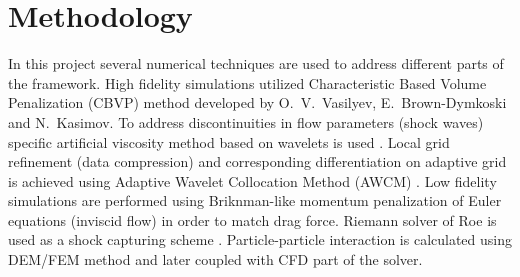 \section{Methodology}
In this project several numerical techniques are used to address different parts of the framework. High fidelity simulations utilized Characteristic Based Volume Penalization (CBVP) method developed by O.~V.~Vasilyev, E.~Brown-Dymkoski and N.~Kasimov. To address discontinuities in flow parameters (shock waves) specific artificial viscosity method based on wavelets is used \cite{lib:RegVas}. Local grid refinement (data compression) and corresponding differentiation on adaptive grid is achieved using Adaptive Wavelet Collocation Method (AWCM) \cite{lib:wlt_main}. Low fidelity simulations are performed using Briknman-like momentum penalization of Euler equations (inviscid flow) in order to match drag force. Riemann solver of Roe is used as a shock capturing scheme \cite{book:Toro}. Particle-particle interaction is calculated using DEM/FEM method and later coupled with CFD part of the solver.
